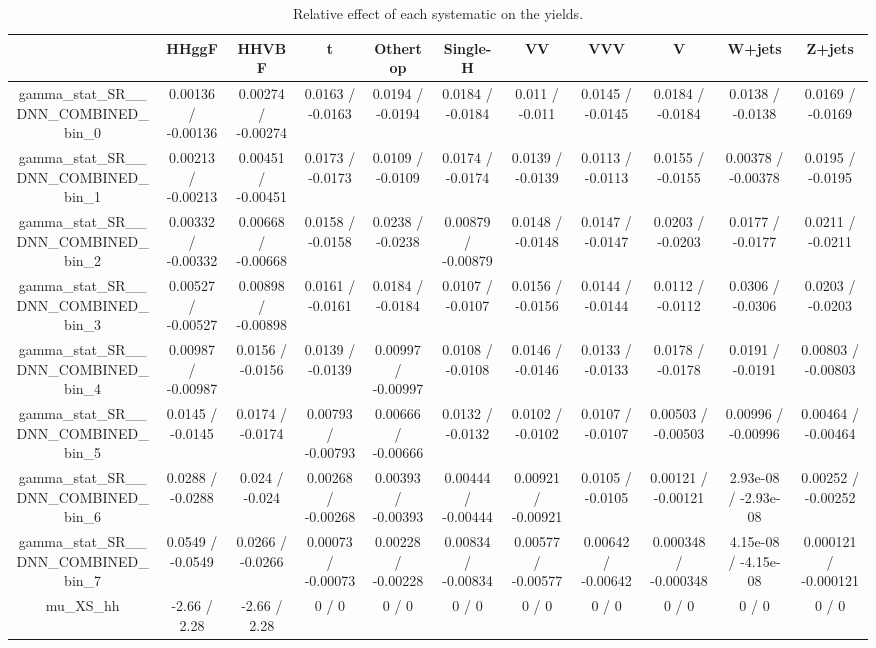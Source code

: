 \documentclass[10pt]{article}
\begin{document}
\begin{table}[htbp]
\begin{center}
\begin{tabular}{|c|c|c|c|c|c|c|c|c|c|c|}
\hline 
      & HHggF      & HHVBF      & t      & Othertop      & Single-H      & VV      & VVV      & V      & W+jets      & Z+jets \\ 
\hline 
  gamma_stat_SR__DNN_COMBINED_bin_0 & 0.00136 / -0.00136 & 0.00274 / -0.00274 & 0.0163 / -0.0163 & 0.0194 / -0.0194 & 0.0184 / -0.0184 & 0.011 / -0.011 & 0.0145 / -0.0145 & 0.0184 / -0.0184 & 0.0138 / -0.0138 & 0.0169 / -0.0169 \\ 
  gamma_stat_SR__DNN_COMBINED_bin_1 & 0.00213 / -0.00213 & 0.00451 / -0.00451 & 0.0173 / -0.0173 & 0.0109 / -0.0109 & 0.0174 / -0.0174 & 0.0139 / -0.0139 & 0.0113 / -0.0113 & 0.0155 / -0.0155 & 0.00378 / -0.00378 & 0.0195 / -0.0195 \\ 
  gamma_stat_SR__DNN_COMBINED_bin_2 & 0.00332 / -0.00332 & 0.00668 / -0.00668 & 0.0158 / -0.0158 & 0.0238 / -0.0238 & 0.00879 / -0.00879 & 0.0148 / -0.0148 & 0.0147 / -0.0147 & 0.0203 / -0.0203 & 0.0177 / -0.0177 & 0.0211 / -0.0211 \\ 
  gamma_stat_SR__DNN_COMBINED_bin_3 & 0.00527 / -0.00527 & 0.00898 / -0.00898 & 0.0161 / -0.0161 & 0.0184 / -0.0184 & 0.0107 / -0.0107 & 0.0156 / -0.0156 & 0.0144 / -0.0144 & 0.0112 / -0.0112 & 0.0306 / -0.0306 & 0.0203 / -0.0203 \\ 
  gamma_stat_SR__DNN_COMBINED_bin_4 & 0.00987 / -0.00987 & 0.0156 / -0.0156 & 0.0139 / -0.0139 & 0.00997 / -0.00997 & 0.0108 / -0.0108 & 0.0146 / -0.0146 & 0.0133 / -0.0133 & 0.0178 / -0.0178 & 0.0191 / -0.0191 & 0.00803 / -0.00803 \\ 
  gamma_stat_SR__DNN_COMBINED_bin_5 & 0.0145 / -0.0145 & 0.0174 / -0.0174 & 0.00793 / -0.00793 & 0.00666 / -0.00666 & 0.0132 / -0.0132 & 0.0102 / -0.0102 & 0.0107 / -0.0107 & 0.00503 / -0.00503 & 0.00996 / -0.00996 & 0.00464 / -0.00464 \\ 
  gamma_stat_SR__DNN_COMBINED_bin_6 & 0.0288 / -0.0288 & 0.024 / -0.024 & 0.00268 / -0.00268 & 0.00393 / -0.00393 & 0.00444 / -0.00444 & 0.00921 / -0.00921 & 0.0105 / -0.0105 & 0.00121 / -0.00121 & 2.93e-08 / -2.93e-08 & 0.00252 / -0.00252 \\ 
  gamma_stat_SR__DNN_COMBINED_bin_7 & 0.0549 / -0.0549 & 0.0266 / -0.0266 & 0.00073 / -0.00073 & 0.00228 / -0.00228 & 0.00834 / -0.00834 & 0.00577 / -0.00577 & 0.00642 / -0.00642 & 0.000348 / -0.000348 & 4.15e-08 / -4.15e-08 & 0.000121 / -0.000121 \\ 
  mu_XS_hh & -2.66 / 2.28 & -2.66 / 2.28 & 0 / 0 & 0 / 0 & 0 / 0 & 0 / 0 & 0 / 0 & 0 / 0 & 0 / 0 & 0 / 0 \\ 
\hline 
\end{tabular} 
\caption{Relative effect of each systematic on the yields.} 
\end{center} 
\end{table} 
\end{document}
